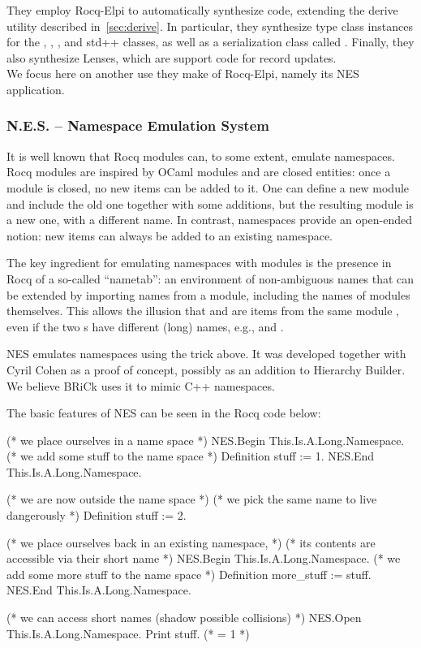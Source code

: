 \documentclass{these-ISSS}
\newenvironment{rocqcode}
  {\VerbatimEnvironment\begin{rocqbox}\begin{xrocqcode}}{\end{xrocqcode}
\end{rocqbox}}
\begin{document}
They employ Rocq-Elpi to automatically synthesize code, extending the derive
utility described in~\cref{sec:derive}. In particular, they synthesize type
class instances for the , , ,
and  std++ classes, as well as a serialization class called
. Finally, they also synthesize Lenses, which are support code for
record updates.
~\\

We focus here on another use they make of Rocq-Elpi, namely its NES
application.

\subsubsection{N.E.S. -- Namespace Emulation System}

It is well known that Rocq modules can, to some extent, emulate namespaces.
Rocq modules are inspired by OCaml modules and are closed entities: once a
module is closed, no new items can be added to it. One can define a new module
and include the old one together with some additions, but the resulting module
is a new one, with a different name. In contrast, namespaces provide an
open-ended notion: new items can always be added to an existing namespace.

The key ingredient for emulating namespaces with modules is the presence in
Rocq of a so-called ``nametab'': an environment of non-ambiguous names that can
be extended by importing names from a module, including the names of modules
themselves. This allows the illusion that  and  are items
from the same module , even if the two s have different (long)
names, e.g.,  and .

NES emulates namespaces using the trick above. It was developed together with
Cyril Cohen as a proof of concept, possibly as an addition to Hierarchy
Builder. We believe BRiCk uses it to mimic C++ namespaces.

The basic features of NES can be seen in the Rocq code below:

\begin{rocqcode}
(* we place ourselves in a name space *)
NES.Begin This.Is.A.Long.Namespace.
  (* we add some stuff to the name space *)
  Definition stuff := 1.
NES.End This.Is.A.Long.Namespace.

(* we are now outside the name space *)
(* we pick the same name to live dangerously *)
Definition stuff := 2.

(* we place ourselves back in an existing namespace, *)
(* its contents are accessible via their short name *)
NES.Begin This.Is.A.Long.Namespace.
  (* we add some more stuff to the name space *)
  Definition more_stuff := stuff.
NES.End This.Is.A.Long.Namespace.

(* we can access short names (shadow possible collisions) *)
NES.Open This.Is.A.Long.Namespace.
Print stuff. (* = 1 *)
\end{rocqcode}
\end{document}
